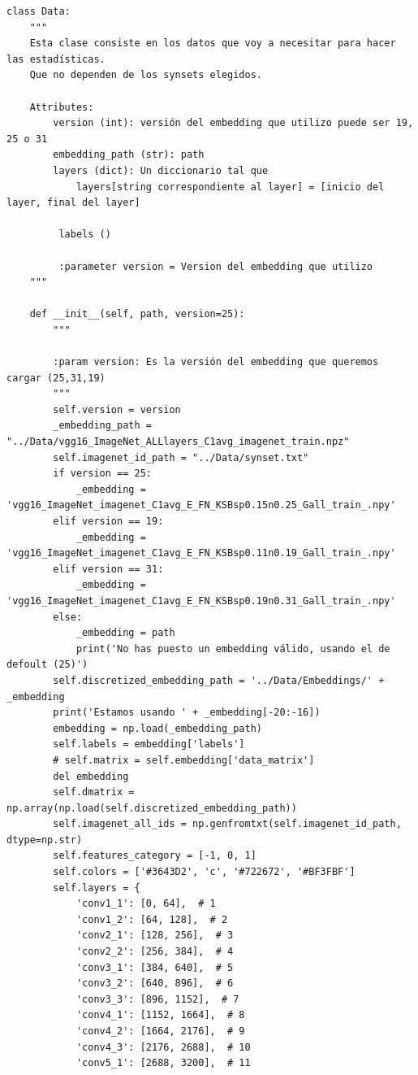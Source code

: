 \documentclass[12,twoside]{TFG-GM}
\theoremstyle{definition}
\theoremstyle{remark}
\begin{document}
\begin{verbatim}
class Data:
    """
    Esta clase consiste en los datos que voy a necesitar para hacer las estadísticas.
    Que no dependen de los synsets elegidos.

    Attributes:
        version (int): versión del embedding que utilizo puede ser 19, 25 o 31
        embedding_path (str): path
        layers (dict): Un diccionario tal que
            layers[string correspondiente al layer] = [inicio del layer, final del layer]

         labels ()

         :parameter version = Version del embedding que utilizo
    """

    def __init__(self, path, version=25):
        """

        :param version: Es la versión del embedding que queremos cargar (25,31,19)
        """
        self.version = version
        _embedding_path = "../Data/vgg16_ImageNet_ALLlayers_C1avg_imagenet_train.npz"
        self.imagenet_id_path = "../Data/synset.txt"
        if version == 25:
            _embedding = 'vgg16_ImageNet_imagenet_C1avg_E_FN_KSBsp0.15n0.25_Gall_train_.npy'
        elif version == 19:
            _embedding = 'vgg16_ImageNet_imagenet_C1avg_E_FN_KSBsp0.11n0.19_Gall_train_.npy'
        elif version == 31:
            _embedding = 'vgg16_ImageNet_imagenet_C1avg_E_FN_KSBsp0.19n0.31_Gall_train_.npy'
        else:
            _embedding = path
            print('No has puesto un embedding válido, usando el de defoult (25)')
        self.discretized_embedding_path = '../Data/Embeddings/' + _embedding
        print('Estamos usando ' + _embedding[-20:-16])
        embedding = np.load(_embedding_path)
        self.labels = embedding['labels']
        # self.matrix = self.embedding['data_matrix']
        del embedding
        self.dmatrix = np.array(np.load(self.discretized_embedding_path))
        self.imagenet_all_ids = np.genfromtxt(self.imagenet_id_path, dtype=np.str)
        self.features_category = [-1, 0, 1]
        self.colors = ['#3643D2', 'c', '#722672', '#BF3FBF']
        self.layers = {
            'conv1_1': [0, 64],  # 1
            'conv1_2': [64, 128],  # 2
            'conv2_1': [128, 256],  # 3
            'conv2_2': [256, 384],  # 4
            'conv3_1': [384, 640],  # 5
            'conv3_2': [640, 896],  # 6
            'conv3_3': [896, 1152],  # 7
            'conv4_1': [1152, 1664],  # 8
            'conv4_2': [1664, 2176],  # 9
            'conv4_3': [2176, 2688],  # 10
            'conv5_1': [2688, 3200],  # 11

\end{verbatim}
\end{document}
